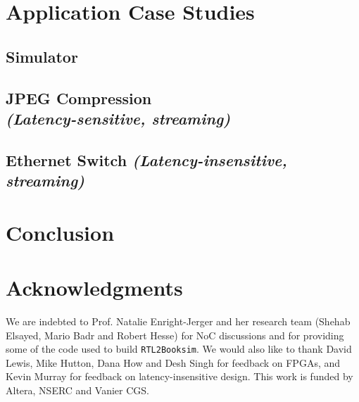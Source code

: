 \documentclass{sig-alternate}
\newcommand{\comment}[1]{}
\begin{document}
\section{Application Case Studies}
\label{sec_apps}
%
\subsection{Simulator}
\label{sec:sim}

%
\subsection{JPEG Compression\\\textit{(Latency-sensitive, streaming)}}

%
\subsection{Ethernet Switch \textit{(Latency-insensitive, streaming)}}

%
%
%
%
\section{Conclusion}
%

%
%
\section{Acknowledgments}
%
We are indebted to Prof. Natalie Enright-Jerger and her research team (Shehab Elsayed, Mario Badr and Robert Hesse) for NoC discussions and for providing some of the code used to build \texttt{RTL2Booksim}.
We would also like to thank David Lewis, Mike Hutton, Dana How and Desh Singh for feedback on FPGAs, and Kevin Murray for feedback on latency-insensitive design.
This work is funded by Altera, NSERC and Vanier CGS.

\newpage
%
%
\begin{small}



 

\end{small}
\end{document}
